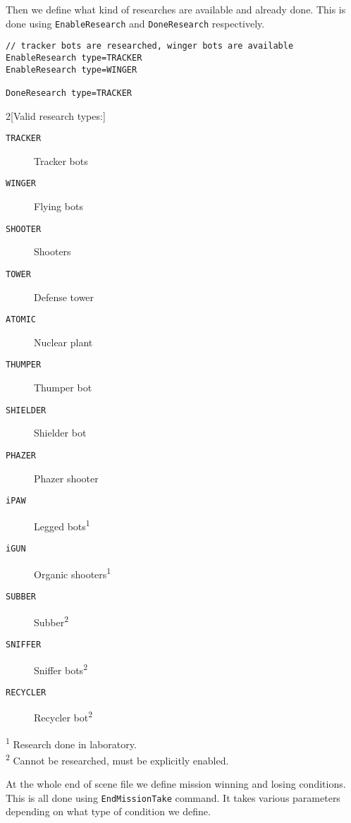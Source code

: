 Then we define what kind of researches are available and already done. This is done using \texttt{EnableResearch} and \texttt{DoneResearch} respectively.

\begin{verbatim}
// tracker bots are researched, winger bots are available
EnableResearch type=TRACKER
EnableResearch type=WINGER

DoneResearch type=TRACKER
\end{verbatim}

\begin{multicols}{2}[Valid research types:]

\begin{description}
    \item[\texttt{TRACKER}] Tracker bots
    \item[\texttt{WINGER}] Flying bots
    \item[\texttt{SHOOTER}] Shooters
    \item[\texttt{TOWER}] Defense tower
    \item[\texttt{ATOMIC}] Nuclear plant
    \item[\texttt{THUMPER}] Thumper bot
    \item[\texttt{SHIELDER}] Shielder bot
    \item[\texttt{PHAZER}] Phazer shooter
    \item[\texttt{iPAW}] Legged bots\textsuperscript{1}
    \item[\texttt{iGUN}] Organic shooters\textsuperscript{1}
    \item[\texttt{SUBBER}] Subber\textsuperscript{2}
    \item[\texttt{SNIFFER}] Sniffer bots\textsuperscript{2}
    \item[\texttt{RECYCLER}] Recycler bot\textsuperscript{2}
\end{description}

\end{multicols}

\textsuperscript{1} Research done in laboratory. \\
\textsuperscript{2} Cannot be researched, must be explicitly enabled.

At the whole end of scene file we define mission winning and losing conditions. This is all done using \texttt{EndMissionTake} command. It takes various parameters depending on what type of condition we define.

